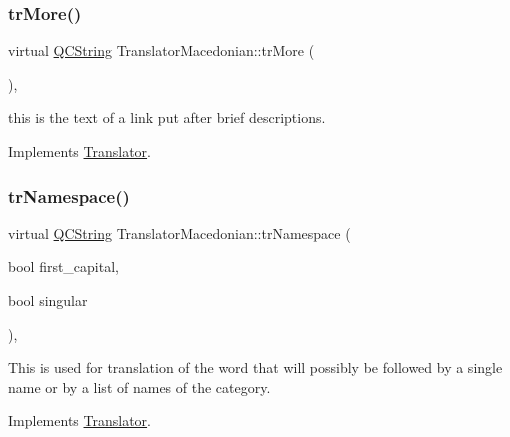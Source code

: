 \mbox{\label{class_translator_macedonian_a385351f456c2bdd92097753be268e5cf}} 
\subsubsection{\texorpdfstring{trMore()}{trMore()}}
{\footnotesize\ttfamily virtual \mbox{\hyperlink{class_q_c_string}{Q\+C\+String}} Translator\+Macedonian\+::tr\+More (\begin{DoxyParamCaption}{ }\end{DoxyParamCaption})\hspace{0.3cm}{\ttfamily [inline]}, {\ttfamily [virtual]}}

this is the text of a link put after brief descriptions. 

Implements \mbox{\hyperlink{class_translator}{Translator}}.

\mbox{\label{class_translator_macedonian_a4cda56f02226284c9ccc113dc15e4202}} 
\subsubsection{\texorpdfstring{trNamespace()}{trNamespace()}}
{\footnotesize\ttfamily virtual \mbox{\hyperlink{class_q_c_string}{Q\+C\+String}} Translator\+Macedonian\+::tr\+Namespace (\begin{DoxyParamCaption}\item[{bool}]{first\+\_\+capital,  }\item[{bool}]{singular }\end{DoxyParamCaption})\hspace{0.3cm}{\ttfamily [inline]}, {\ttfamily [virtual]}}

This is used for translation of the word that will possibly be followed by a single name or by a list of names of the category. 

Implements \mbox{\hyperlink{class_translator}{Translator}}.

\mbox{\label{class_translator_macedonian_a88e7316dfbfc47baeecf82a657d68062}} 
